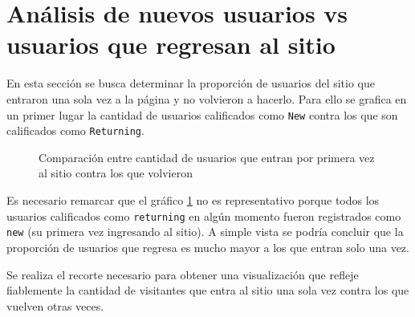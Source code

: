 \documentclass[a4paper]{article}
\begin{document}
\section{Análisis de nuevos usuarios vs usuarios que regresan al sitio}

En esta sección se busca determinar la proporción de usuarios del sitio que entraron una sola vez a la página y no volvieron a hacerlo. Para ello se grafica en un primer lugar la cantidad de usuarios calificados como \texttt{New} contra los que son calificados como \texttt{Returning}.

\begin{figure}[!h]
	\caption{Comparación entre cantidad de usuarios que entran por primera vez al sitio contra los que volvieron}
	\label{fig:newvsreturningfalse}
\end{figure}

Es necesario remarcar que el gráfico \ref{fig:newvsreturningfalse} no es representativo porque todos los usuarios calificados como \texttt{returning} en algún momento fueron registrados como \texttt{new} (su primera vez ingresando al sitio). A simple vista se podría concluir que la proporción de usuarios que regresa es mucho mayor a los que entran solo una vez. 

Se realiza el recorte necesario para obtener una visualización que refleje fiablemente la cantidad de visitantes que entra al sitio una sola vez contra los que vuelven otras veces. 
\end{document}
